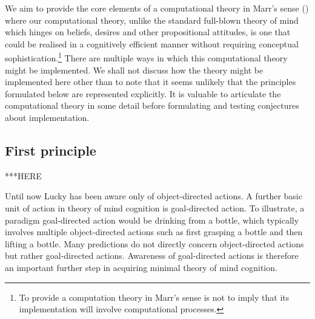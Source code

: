 \documentclass[12pt,\papersize]{extarticle}
\begin{document}
	We aim to provide the core elements of a computational theory in Marr’s sense (\citeyear[][pp.\ 15-29]{en_917}) where our computational theory, unlike the standard full-blown theory of mind which hinges on beliefs, desires and other propositional attitudes, is one that could be realised in a cognitively efficient manner without requiring conceptual sophistication.\footnote{ 	To provide a computation theory in Marr’s sense is not to imply that its implementation will involve computational processes.}  There are multiple ways in which this computational theory might be implemented.  We shall not discuss how the theory might be implemented here other than to note that it seems unlikely that the principles formulated below are represented explicitly.  It is valuable to articulate the computational theory in some detail before formulating and testing conjectures about implementation.  



\subsection{First principle}

***HERE

Until now Lucky has been aware only of object-directed actions.  A further basic unit of action in theory of mind cognition is goal-directed action. To illustrate, a paradigm goal-directed action would be drinking from a bottle, which typically involves multiple object-directed actions such as first grasping a bottle and then lifting a bottle.  Many predictions do not directly concern object-directed actions but rather goal-directed actions.  Awareness of goal-directed actions is therefore an important further step in acquiring minimal theory of mind cognition. 
\end{document}
